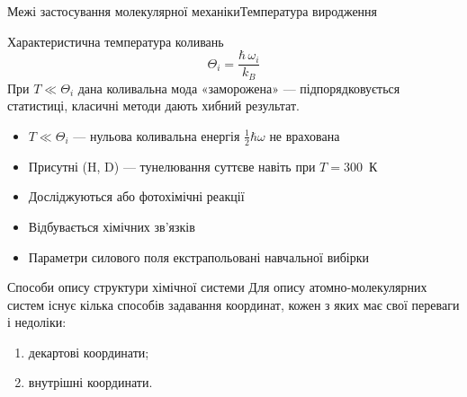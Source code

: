 \documentclass[]{beamer}
\begin{document}
\begin{frame}{Межі застосування молекулярної механіки}{Температура виродження}
	\begin{alertblock}{Характеристична температура коливань}\small\justifying
		\begin{equation*}
			\Theta_i = \frac{\hbar\,\omega_i}{k_B}
		\end{equation*}
		При $T \ll \Theta_i$ дана коливальна мода «заморожена» --- підпорядковується  статистиці, класичні методи дають хибний результат.
	\end{alertblock}
	\begin{itemize}
		\item $T \ll \Theta_i$ --- нульова коливальна енергія $\tfrac{1}{2}\hbar\omega$ не врахована
		\item Присутні  (H, D) --- тунелювання суттєве навіть при $T = 300$~К
		\item Досліджуються  або фотохімічні реакції
		\item Відбувається  хімічних зв'язків
		\item Параметри силового поля екстрапольовані  навчальної вибірки
	\end{itemize}
\end{frame}


\begin{frame}{Способи опису структури хімічної системи}{}
	Для опису атомно-молекулярних систем існує кілька способів задавання координат, кожен з яких має свої переваги і
	недоліки:
	\begin{enumerate}
		\item декартові координати;
		\item внутрішні координати.
	\end{enumerate}
\end{frame}
\end{document}
